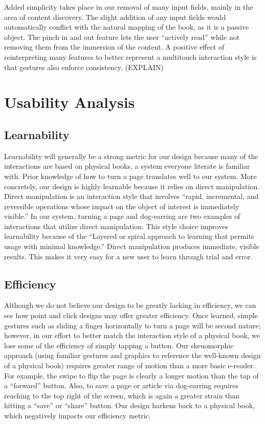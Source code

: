 \documentclass[11pt, oneside]{article}   	%
\begin{document}
Added simplicity takes place in our removal of many input fields, mainly in the area of content discovery. The slight addition of any input fields would automatically conflict with the natural mapping of the book, as it is a passive object. The pinch in and out feature lets the user ``actively read'' while not removing them from the immersion of the content. A positive effect of reinterpreting many features to better represent a multitouch interaction style is that gestures also enforce consistency. (EXPLAIN)

\section{Usability Analysis}

\subsection {Learnability}
Learnability will generally be a strong metric for our design because many of the interactions are based on physical books, a system everyone literate is familiar with. Prior knowledge of how to turn a page translates well to our system. More concretely, our design is highly learnable because it relies on direct manipulation. Direct manipulation is an interaction style that involves ``rapid, incremental, and reversible operations whose impact on the object of interest is immediately visible.'' \cite{Kwon} In our system, turning a page and dog-earring are two examples of interactions that utilize direct manipulation. This style choice improves learnability because of the ``Layered or spiral approach to learning that permits usage
with minimal knowledge.'' \cite{Kwon} Direct manipulation produces immediate, visible results. This makes it very easy for a new user to learn through trial and error.
\subsection {Efficiency}
Although we do not believe our design to be greatly lacking in efficiency, we can see how point and click designs may offer greater efficiency. Once learned, simple gestures such as sliding a finger horizontally to turn a page will be second nature; however, in our effort to better match the interaction style of a physical book, we lose some of the efficiency of simply tapping a button. Our skeuomorphic approach (using familiar gestures and graphics to reference the well-known design of a physical book) requires greater range of motion than a more basic e-reader. For example, the swipe to flip the page is clearly a longer motion than the tap of a ``forward'' button. Also, to save a page or article via dog-earring requires reaching to the top right of the screen, which is again a greater strain than hitting a  ``save'' or ``share'' button. Our design harkens back to a physical book, which negatively impacts our efficiency metric.
\end{document}
